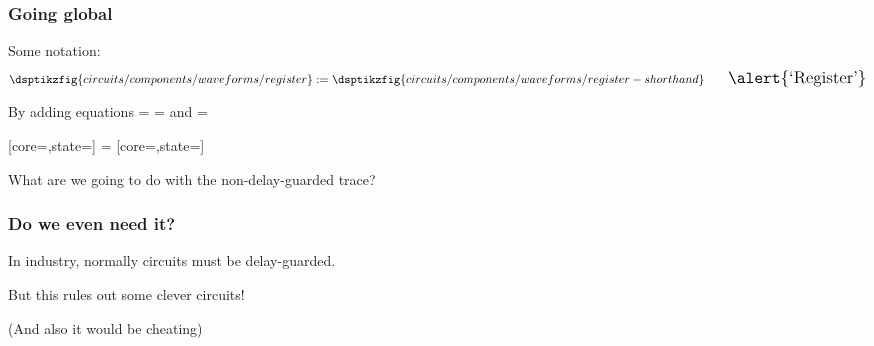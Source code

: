 \begin{frame}
    \frametitle{Going global}

    \centering
    \Large
    Some notation:
    \normalsize
    \begin{gather*}
        \dsptikzfig{circuits/components/waveforms/register}
        :=
        \dsptikzfig{circuits/components/waveforms/register-shorthand}
        \qquad
        \Large
        \text{\alert{`Register'}}
    \end{gather*}

    \pause
    By adding equations
    \Large=\normalsize
    \Large=\normalsize
    and
    \Large=\normalsize

    [core=,state=]
    \Large=\normalsize
    [core=,state=]

    \pause
    \vspace{1em}
    \Large
    What are we going to do with the non-delay-guarded trace?

\end{frame}
\begin{frame}
    \frametitle{Do we even need it?}

    In industry, normally circuits must be \alert{delay-guarded}.

    \pause

    But this rules out some \alert{clever} circuits!

    \vspace{0.5em}


    \pause

    \vspace{0.5em}

    \scriptsize
    (And also it would be cheating)

\end{frame}
